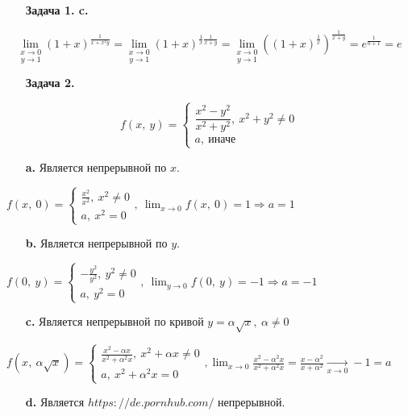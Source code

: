 \documentclass[12pt, letterpaper, twoside]{article}
\newcommand{\DS}{\displaystyle}
\begin{document}
    \begin{enumerate}
        \item[\textbf{Задача 1. c.}]
    \end{enumerate}
    \[\underset{y\to 1}{\lim_{x\to 0}} (1 + x)^{\frac{1}{x + x^2y}} = \underset{y\to 1}{\lim_{x\to 0}} (1 + x)^{\frac{1}{x}\frac{1}{x + y}}= \underset{y\to 1}{\lim_{x\to 0}} \left( (1 + x)^{\frac{1}{x}} \right)^{\frac{1}{x + y}} = e^{\frac{1}{0 + 1}} = e\]
    \begin{enumerate}
        \item[\textbf{Задача 2.}]
    \end{enumerate}
    \[f(x,\ y) = \begin{cases}
        \dfrac{x^2 - y^2}{x^2 + y^2},\ x^2 + y^2 \neq 0\\
        a,\ \text{иначе}
    \end{cases}\]
    \begin{enumerate}
        \item[\textbf{a.}] Является непрерывной по $x$.
    \end{enumerate}
    $f(x,\ 0) = \begin{cases}
        \frac{x^2}{x^2},\ x^2 \neq 0\\
        a,\ x^2 = 0
    \end{cases},\ \DS \lim_{x\to 0} f(x,\ 0) = 1\Rightarrow a = 1$
    \begin{enumerate}
        \item[\textbf{b.}] Является непрерывной по $y$.
    \end{enumerate}
    $f(0,\ y) = \begin{cases}
        -\frac{y^2}{y^2},\ y^2 \neq 0\\
        a,\ y^2 = 0
    \end{cases},\ \DS \lim_{y\to 0} f(0,\ y) = -1\Rightarrow a = -1$
    \begin{enumerate}
        \item[\textbf{c.}] Является непрерывной по кривой $y = \alpha\sqrt{x},\ \alpha \neq 0$ 
    \end{enumerate}
    $f(x,\ \alpha\sqrt{x}) = \begin{cases}
        \frac{x^2 - \alpha x}{x^2 + \alpha^2 x},\ x^2 + \alpha x \neq 0\\
        a,\ x^2 + \alpha^2 x = 0
    \end{cases},\DS \lim_{x\to 0} \frac{x^2 - \alpha^2 x}{x^2 + \alpha^2 x} = \frac{x - \alpha^2}{x + \alpha^2} \xrightarrow[x\to 0]{} -1 = a$
    \begin{enumerate}
        \item[\textbf{d.}] Является $https://de.pornhub.com/$ непрерывной.
    \end{enumerate}
\end{document}
